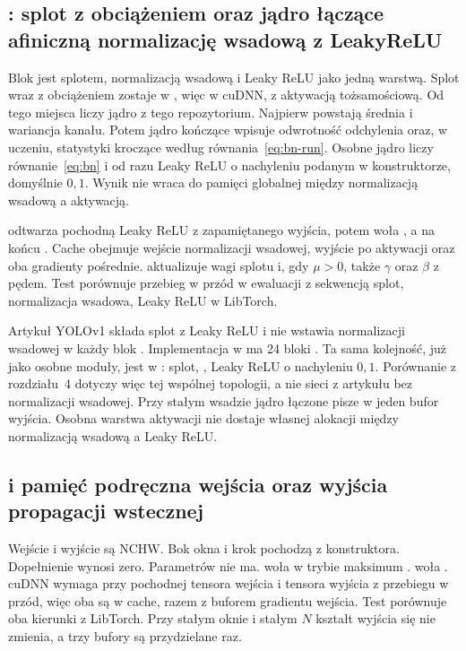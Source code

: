 \subsection{: splot z obciążeniem oraz jądro łączące afiniczną normalizację wsadową z LeakyReLU}

Blok jest splotem, normalizacją wsadową i Leaky ReLU jako jedną warstwą. Splot wraz z obciążeniem zostaje w , więc w cuDNN, z aktywacją tożsamościową. Od tego miejsca liczy jądro z tego repozytorium. Najpierw powstają średnia i wariancja kanału. Potem jądro kończące wpisuje odwrotność odchylenia oraz, w uczeniu, statystyki kroczące według równania~\eqref{eq:bn-run}. Osobne jądro liczy równanie~\eqref{eq:bn} i od razu Leaky ReLU o nachyleniu podanym w konstruktorze, domyślnie \(0{,}1\). Wynik nie wraca do pamięci globalnej między normalizacją wsadową a aktywacją.

 odtwarza pochodną Leaky ReLU z zapamiętanego wyjścia, potem woła , a na końcu . Cache obejmuje wejście normalizacji wsadowej, wyjście po aktywacji oraz oba gradienty pośrednie.  aktualizuje wagi splotu i, gdy \(\mu > 0\), także \(\gamma\) oraz \(\beta\) z pędem. Test  porównuje przebieg w przód w ewaluacji z sekwencją splot, normalizacja wsadowa, Leaky ReLU w LibTorch.

Artykuł YOLOv1 składa splot z Leaky ReLU i nie wstawia normalizacji wsadowej w każdy blok \cite{redmon2016yolo}. Implementacja w  ma 24 bloki . Ta sama kolejność, już jako osobne moduły, jest w : splot, , Leaky ReLU o nachyleniu \(0{,}1\). Porównanie z rozdziału~4 dotyczy więc tej wspólnej topologii, a nie sieci z artykułu bez normalizacji wsadowej. Przy stałym wsadzie jądro łączone pisze w jeden bufor wyjścia. Osobna warstwa aktywacji nie dostaje własnej alokacji między normalizacją wsadową a Leaky ReLU.

\subsection{ i pamięć podręczna wejścia oraz wyjścia propagacji wstecznej}

Wejście i wyjście są NCHW. Bok okna i krok pochodzą z konstruktora. Dopełnienie wynosi zero. Parametrów nie ma.  woła  w trybie maksimum \cite{nvidia-cudnn}.  woła . cuDNN wymaga przy pochodnej tensora wejścia i tensora wyjścia z przebiegu w przód, więc oba są w cache, razem z buforem gradientu wejścia. Test  porównuje oba kierunki z LibTorch. Przy stałym oknie i stałym \(N\) kształt wyjścia się nie zmienia, a trzy bufory są przydzielane raz.

